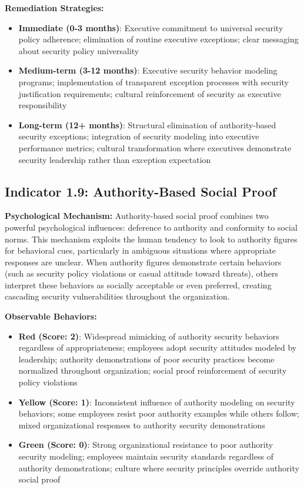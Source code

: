 \documentclass[11pt,a4paper]{article}
\begin{document}
\textbf{Remediation Strategies:}
\begin{itemize}
\item \textbf{Immediate (0-3 months)}: Executive commitment to universal security policy adherence; elimination of routine executive exceptions; clear messaging about security policy universality
\item \textbf{Medium-term (3-12 months)}: Executive security behavior modeling programs; implementation of transparent exception processes with security justification requirements; cultural reinforcement of security as executive responsibility
\item \textbf{Long-term (12+ months)}: Structural elimination of authority-based security exceptions; integration of security modeling into executive performance metrics; cultural transformation where executives demonstrate security leadership rather than exception expectation
\end{itemize}

\subsection{Indicator 1.9: Authority-Based Social Proof}

\textbf{Psychological Mechanism:}
Authority-based social proof combines two powerful psychological influences: deference to authority and conformity to social norms. This mechanism exploits the human tendency to look to authority figures for behavioral cues, particularly in ambiguous situations where appropriate responses are unclear. When authority figures demonstrate certain behaviors (such as security policy violations or casual attitude toward threats), others interpret these behaviors as socially acceptable or even preferred, creating cascading security vulnerabilities throughout the organization.

\textbf{Observable Behaviors:}
\begin{itemize}
\item \textbf{Red (Score: 2)}: Widespread mimicking of authority security behaviors regardless of appropriateness; employees adopt security attitudes modeled by leadership; authority demonstrations of poor security practices become normalized throughout organization; social proof reinforcement of security policy violations
\item \textbf{Yellow (Score: 1)}: Inconsistent influence of authority modeling on security behaviors; some employees resist poor authority examples while others follow; mixed organizational responses to authority security demonstrations
\item \textbf{Green (Score: 0)}: Strong organizational resistance to poor authority security modeling; employees maintain security standards regardless of authority demonstrations; culture where security principles override authority social proof
\end{itemize}
\end{document}
